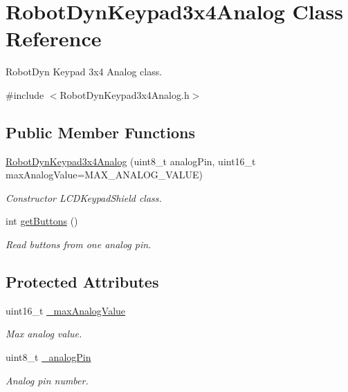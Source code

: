 \hypertarget{class_robot_dyn_keypad3x4_analog}{}\section{Robot\+Dyn\+Keypad3x4\+Analog Class Reference}
\label{class_robot_dyn_keypad3x4_analog}


Robot\+Dyn Keypad 3x4 Analog class.  




{\ttfamily \#include $<$Robot\+Dyn\+Keypad3x4\+Analog.\+h$>$}

\subsection*{Public Member Functions}
\begin{DoxyCompactItemize}
\item 
\hyperlink{class_robot_dyn_keypad3x4_analog_afbbe61d9d440d6f99befeb6cd819e90e}{Robot\+Dyn\+Keypad3x4\+Analog} (uint8\+\_\+t analog\+Pin, uint16\+\_\+t max\+Analog\+Value=M\+A\+X\+\_\+\+A\+N\+A\+L\+O\+G\+\_\+\+V\+A\+L\+UE)
\begin{DoxyCompactList}\small\item\em Constructor L\+C\+D\+Keypad\+Shield class. \end{DoxyCompactList}\item 
int \hyperlink{class_robot_dyn_keypad3x4_analog_a2124fcf7e5e0298b537d2493549a9082}{get\+Buttons} ()
\begin{DoxyCompactList}\small\item\em Read buttons from one analog pin. \end{DoxyCompactList}\end{DoxyCompactItemize}
\subsection*{Protected Attributes}
\begin{DoxyCompactItemize}
\item 
uint16\+\_\+t \hyperlink{class_robot_dyn_keypad3x4_analog_a27cbce4f1859303d0909335e72d43b91}{\+\_\+max\+Analog\+Value}\hypertarget{class_robot_dyn_keypad3x4_analog_a27cbce4f1859303d0909335e72d43b91}{}\label{class_robot_dyn_keypad3x4_analog_a27cbce4f1859303d0909335e72d43b91}

\begin{DoxyCompactList}\small\item\em Max analog value. \end{DoxyCompactList}\item 
uint8\+\_\+t \hyperlink{class_robot_dyn_keypad3x4_analog_a7ab95a55b9b0faaab6c2fab240d8080f}{\+\_\+analog\+Pin}\hypertarget{class_robot_dyn_keypad3x4_analog_a7ab95a55b9b0faaab6c2fab240d8080f}{}\label{class_robot_dyn_keypad3x4_analog_a7ab95a55b9b0faaab6c2fab240d8080f}

\begin{DoxyCompactList}\small\item\em Analog pin number. \end{DoxyCompactList}\end{DoxyCompactItemize}


